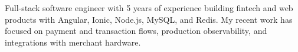 

\begin{cvparagraph}

Full-stack software engineer with 5 years of experience building fintech and web products with Angular, Ionic, Node.js, MySQL, and Redis. My recent work has focused on payment and transaction flows, production observability, and integrations with merchant hardware.
\end{cvparagraph}
